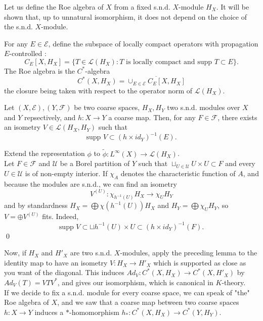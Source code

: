 Let us define the Roe algebra of $X$ from a fixed s.n.d. $X$-module $H_X$. It will be shown that, up to unnatural isomorphism, it does not depend on the choice of the s.n.d. $X$-module.\\

\begin{definition}
For any $E\in \mathcal E$, define the subspace of locally compact operators with propagation $E$-controlled :
\[C_E[X,H_X] = \{T\in\mathcal L(H_X) : T \text{ is locally compact and supp }T\subset E\}.\]
The Roe algebra is the $C^*$-algebra 
\[C^*(X,H_X) = \overline{\cup_{E\in\mathcal E} C_E[X,H_X]}\]
the closure being taken with respect to the operator norm of $\mathcal L(H_X)$.
\end{definition}

\begin{prop}
Let $(X,\mathcal E),(Y,\mathcal F)$ be two coarse spaces, $H_X,H_Y$ two s.n.d. modules over $X$ and $Y$ repsectively, and $h :X\rightarrow Y$ a coarse map. Then, for any $F\in \mathcal F$, there exists an isometry $V\in \mathcal L(H_X,H_Y)$ such that
\[\text{supp }V \subset (h\times id_Y)^{-1}(E).\]
\end{prop}

\begin{dem}
Extend the representation $\phi$ to $\tilde \phi : L^\infty (X)\rightarrow \mathcal L(H_X)$. \\

Let $F\in \mathcal F$ and $\mathcal U$ be a Borel partition of $Y$ such that $\sqcup_{U\in \mathcal U} U\times U \subset F$ and every $U\in \mathcal U$ is of non-empty interior. If $\chi_A$ denotes the characteristic function of $A$, and because the modules are s.n.d., we can find an isometry \[V^{(U)} :\chi_{h^{-1}(U)}H_X \rightarrow \chi_U H_Y\] 
and by standardness $H_X =\bigoplus \chi(h^{-1}(U)) H_X$ and $H_Y =\bigoplus \chi_U H_Y$, so $V = \oplus V^{(U)}$ fits. Indeed, 
\[\text{supp }V\subset \sqcup h^{-1}(U)\times U \subset (h\times id_Y)^{-1}(F).\] 
\qed
\end{dem}

Now, if $H_X$ and $H'_X$ are two s.n.d. $X$-modules, apply the preceding lemma to the identity map to have an isometry $V: H_X\rightarrow H'_X$ which is supported as close as you want of the diagonal. This induces $Ad_V : C^*(X,H_X)\rightarrow C^*(X,H'_X)$ by $Ad_V(T) = VTV^*$, and gives our isomorphism, which is canonical in $K$-theory. \\

If we decide to fix a s.n.d. module for every coarse space, we can speak of "the" Roe algebra of $X$, and we saw that a coarse map between two coarse spaces $h : X\rightarrow Y$ induces a $*$-homomorphism $h_* : C^*(X,H_X)\rightarrow C^*(Y,H_Y)$. \\

